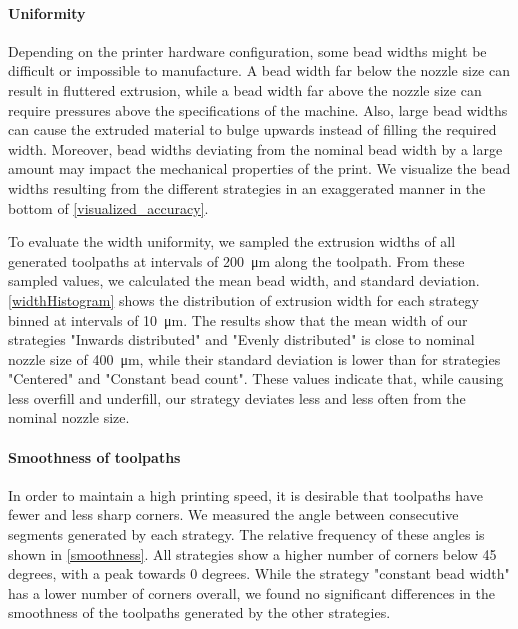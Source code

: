 \paragraph{Uniformity}
Depending on the printer hardware configuration, some bead widths might be difficult or impossible to manufacture.
A bead width far below the nozzle size can result in fluttered extrusion, while a bead width far above the nozzle size can require pressures above the specifications of the machine. 
Also, large bead widths can cause the extruded material to bulge upwards instead of filling the required width.
Moreover, bead widths deviating from the nominal bead width by a large amount may impact the mechanical properties of the print.
We visualize the bead widths resulting from the different strategies in an exaggerated manner in the bottom of \cref{visualized_accuracy}.

To evaluate the width uniformity, we sampled the extrusion widths of all generated toolpaths 
at intervals of \SI{200}{\micro\meter} along the toolpath.
From these sampled values, we calculated the mean bead width, and standard deviation.
\cref{widthHistogram} shows the distribution of extrusion width for each strategy binned at intervals of  \SI{10}{\micro\meter}.
The results show that the mean width of our strategies "Inwards distributed" and "Evenly distributed" is close to nominal nozzle size of \SI{400}{\micro\meter}, while their standard deviation is lower than for strategies "Centered" and "Constant bead count". 
These values indicate that, while causing less overfill and underfill, our strategy deviates less and less often from the nominal nozzle size.

\paragraph{Smoothness of toolpaths}
In order to maintain a high printing speed, it is desirable that toolpaths have fewer and less sharp corners. 
We measured the angle between consecutive segments generated by each strategy.
The relative frequency of these angles is shown in \cref{smoothness}.
All strategies show a higher number of corners below 45 degrees, with a peak towards 0 degrees.
While the strategy "constant bead width" has a lower number of corners overall, we found no significant differences in the smoothness of the toolpaths generated by the other strategies. 

